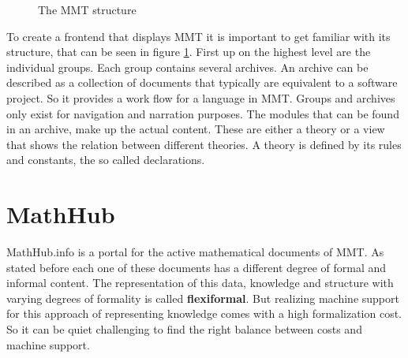 \documentclass[11pt,a4paper]{article}
\providecommand\myxscale{.95}
\providecommand\myyscale{1}
\begin{document}
\begin{figure}[H]
\caption{The MMT structure}
\label{fig:mmt}
\end{figure}


To create a frontend that displays MMT it is important to get familiar with its structure, that can be seen in figure \ref{fig:mmt}.
First up on the highest level are the individual groups.
Each group contains several archives.
An archive can be described as a collection of documents that typically are equivalent to a software project.
So it provides a work flow for a language in MMT.
Groups and archives only exist for navigation and narration purposes.
The modules that can be found in an archive, make up the actual content.
These are either a theory or a view that shows the relation between different theories.
A theory is defined by its rules and constants, the so called declarations.
\cite{mmt}

\section{MathHub} \label{mathhub}
MathHub.info is a portal for the active mathematical documents of MMT.
As stated before each one of these documents has a different degree of formal and informal content.
The representation of this data, knowledge and structure with varying degrees of formality is called \textbf{flexiformal}.
But realizing machine support for this approach of representing knowledge comes with a high formalization cost.
So it can be quiet challenging to find the right balance between costs and machine support.
\end{document}
